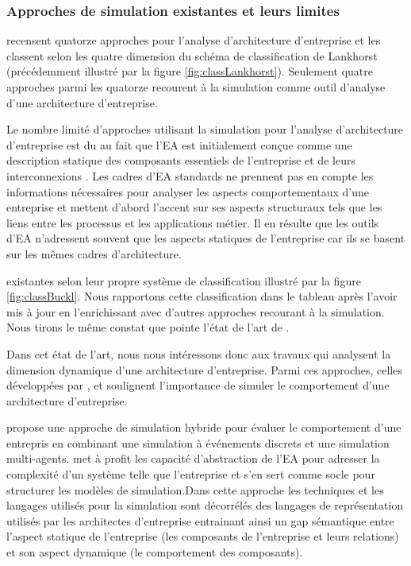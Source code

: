 	\subsubsection{Approches de simulation existantes et leurs limites}
\cite{manzur2015xarchimate} recensent quatorze approches pour l'analyse 
d'architecture d'entreprise et les classent selon les quatre dimension du schéma 
de classification de Lankhorst (précédemment illustré par la figure 
\ref{fig:classLankhorst}). Seulement quatre approches parmi les quatorze 
recourent à la simulation comme outil d'analyse d'une architecture d'entreprise.

Le nombre limité d'approches utilisant la simulation pour l'analyse 
d'architecture d'entreprise est du au fait que l'EA est initialement conçue 
comme une description statique des composants essentiels de l'entreprise et de 
leurs interconnexions \cite{hoffman2013enterprise}. Les cadres d'EA standards ne 
prennent pas en compte les informations nécessaires pour analyser les aspects 
comportementaux d'une entreprise et mettent d'abord l'accent sur ses aspects 
structuraux tels que les liens entre les processus et les applications métier. 
Il en résulte que les outils d'EA n'adressent souvent que les aspects statiques 
de l'entreprise car ils se basent sur les mêmes cadres d'architecture.

existantes selon leur propre système de classification illustré par la figure 
\ref{fig:classBuckl}. Nous rapportons cette classification dans le tableau après 
l'avoir mis à jour en l'enrichissant avec d'autres approches recourant à la 
simulation. Nous tirons le même constat que pointe l'état de l'art de 
\cite{manzur2015xarchimate}. 

Dans cet état de l'art, nous nous intéressons donc aux travaux qui analysent la 
dimension dynamique d'une architecture d'entreprise. Parmi ces approches, celles 
développées par \cite{glazner2011enterprise}, \cite{ludwig2011organizational} et 
\cite{manzur2015xarchimate} soulignent l'importance de simuler le comportement 
d'une architecture d'entreprise. 

\cite{glazner2011enterprise} propose une approche de simulation hybride pour 
évaluer le comportement d'une entrepris en combinant une simulation à événements 
discrets et une simulation multi-agents. \cite{glazner2011enterprise} met à 
profit les capacité d'abstraction de l'EA pour adresser la complexité d'un 
système telle que l'entreprise et s'en sert comme socle pour structurer les 
modèles de simulation.Dans cette approche les techniques et les langages 
utilisés pour la simulation sont décorrélés des langages de représentation 
utilisés par les architectes d'entreprise entrainant ainsi un gap sémantique 
entre l'aspect statique de l'entreprise (les composants de l'entreprise et leurs 
relations) et son aspect dynamique (le comportement des composants). 

